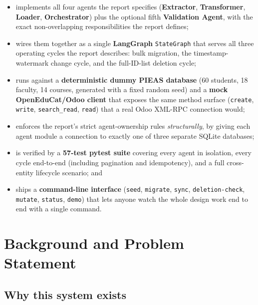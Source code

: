 \documentclass[11pt,a4paper]{article}
\begin{document}
\begin{itemize}[leftmargin=1.4em]
    \item implements all four agents the report specifies (\textbf{Extractor}, \textbf{Transformer},
          \textbf{Loader}, \textbf{Orchestrator}) plus the optional fifth \textbf{Validation Agent},
          with the exact non-overlapping responsibilities the report defines;
    \item wires them together as a single \textbf{LangGraph} \texttt{StateGraph} that serves all
          three operating cycles the report describes: bulk migration, the timestamp-watermark
          change cycle, and the full-ID-list deletion cycle;
    \item runs against a \textbf{deterministic dummy PIEAS database} (60 students, 18 faculty,
          14 courses, generated with a fixed random seed) and a \textbf{mock OpenEduCat/Odoo
          client} that exposes the same method surface (\texttt{create}, \texttt{write},
          \texttt{search\_read}, \texttt{read}) that a real Odoo XML-RPC connection would;
    \item enforces the report's strict agent-ownership rules \emph{structurally}, by giving each
          agent module a connection to exactly one of three separate SQLite databases;
    \item is verified by a \textbf{57-test pytest suite} covering every agent in isolation, every
          cycle end-to-end (including pagination and idempotency), and a full cross-entity
          lifecycle scenario; and
    \item ships a \textbf{command-line interface} (\texttt{seed}, \texttt{migrate}, \texttt{sync},
          \texttt{deletion-check}, \texttt{mutate}, \texttt{status}, \texttt{demo}) that lets
          anyone watch the whole design work end to end with a single command.
\end{itemize}

\section{Background and Problem Statement}

\subsection{Why this system exists}
\end{document}
